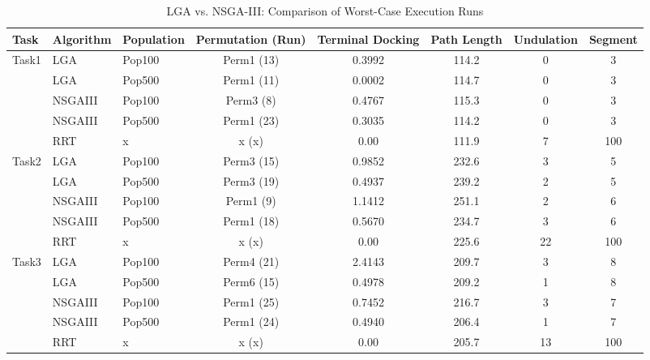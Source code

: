 \documentclass[8pt]{article}
\begin{document}
\begin{table}[htbp]
\centering
\caption{LGA vs. NSGA-III: Comparison of Worst-Case Execution Runs}
\label{tab:worst_case_failures}
\begin{tabular}{lllc cccc}
\toprule
Task & Algorithm & Population & Permutation (Run) & Terminal Docking & Path Length & Undulation & Segment \\
\midrule

Task1 & LGA & Pop100 & Perm1 (13) & 0.3992 & 114.2 & 0 & 3 \\
 & LGA & Pop500 & Perm1 (11) & 0.0002 & 114.7 & 0 & 3 \\
 & NSGAIII & Pop100 & Perm3 (8) & 0.4767 & 115.3 & 0 & 3 \\
 & NSGAIII & Pop500 & Perm1 (23) & 0.3035 & 114.2 & 0 & 3 \\
 & RRT & x & x (x) & 0.00 & 111.9 & 7 & 100 \\
\midrule
Task2 & LGA & Pop100 & Perm3 (15) & 0.9852 & 232.6 & 3 & 5 \\
 & LGA & Pop500 & Perm3 (19) & 0.4937 & 239.2 & 2 & 5 \\
 & NSGAIII & Pop100 & Perm1 (9) & 1.1412 & 251.1 & 2 & 6 \\
 & NSGAIII & Pop500 & Perm1 (18) & 0.5670 & 234.7 & 3 & 6 \\
 & RRT & x & x (x) & 0.00 & 225.6 & 22 & 100 \\
\midrule
Task3 & LGA & Pop100 & Perm4 (21) & 2.4143 & 209.7 & 3 & 8 \\
 & LGA & Pop500 & Perm6 (15) & 0.4978 & 209.2 & 1 & 8 \\
 & NSGAIII & Pop100 & Perm1 (25) & 0.7452 & 216.7 & 3 & 7 \\
 & NSGAIII & Pop500 & Perm1 (24) & 0.4940 & 206.4 & 1 & 7 \\
 & RRT & x & x (x) & 0.00 & 205.7 & 13 & 100 \\
\bottomrule
\end{tabular}
\end{table}






\end{document}
